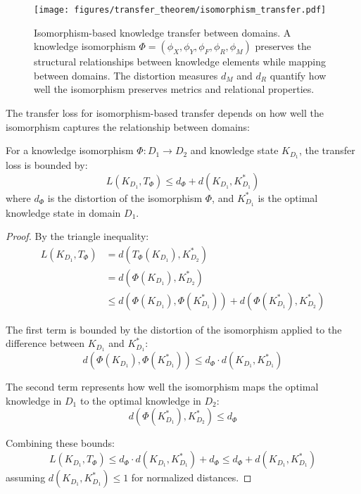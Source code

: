 \begin{figure}[ht]
    \centering
    \texttt{[image: figures/transfer\_theorem/isomorphism\_transfer.pdf]}
    \caption{Isomorphism-based knowledge transfer between domains. A knowledge isomorphism $\Phi = (\phi_X, \phi_Y, \phi_F, \phi_R, \phi_M)$ preserves the structural relationships between knowledge elements while mapping between domains. The distortion measures $d_M$ and $d_R$ quantify how well the isomorphism preserves metrics and relational properties.}
    \label{fig:isomorphism_transfer}
\end{figure}

The transfer loss for isomorphism-based transfer depends on how well the isomorphism captures the relationship between domains:

\begin{theorem}
For a knowledge isomorphism $\Phi: D_1 \to D_2$ and knowledge state $K_{D_1}$, the transfer loss is bounded by:
\begin{equation}
L(K_{D_1}, T_{\Phi}) \leq d_{\Phi} + d(K_{D_1}, K_{D_1}^*)
\end{equation}
where $d_{\Phi}$ is the distortion of the isomorphism $\Phi$, and $K_{D_1}^*$ is the optimal knowledge state in domain $D_1$.
\end{theorem}

\begin{proof}
By the triangle inequality:
\begin{align}
L(K_{D_1}, T_{\Phi}) &= d(T_{\Phi}(K_{D_1}), K_{D_2}^*) \\
&= d(\Phi(K_{D_1}), K_{D_2}^*) \\
&\leq d(\Phi(K_{D_1}), \Phi(K_{D_1}^*)) + d(\Phi(K_{D_1}^*), K_{D_2}^*)
\end{align}

The first term is bounded by the distortion of the isomorphism applied to the difference between $K_{D_1}$ and $K_{D_1}^*$:
\begin{equation}
d(\Phi(K_{D_1}), \Phi(K_{D_1}^*)) \leq d_{\Phi} \cdot d(K_{D_1}, K_{D_1}^*)
\end{equation}

The second term represents how well the isomorphism maps the optimal knowledge in $D_1$ to the optimal knowledge in $D_2$:
\begin{equation}
d(\Phi(K_{D_1}^*), K_{D_2}^*) \leq d_{\Phi}
\end{equation}

Combining these bounds:
\begin{equation}
L(K_{D_1}, T_{\Phi}) \leq d_{\Phi} \cdot d(K_{D_1}, K_{D_1}^*) + d_{\Phi} \leq d_{\Phi} + d(K_{D_1}, K_{D_1}^*)
\end{equation}
assuming $d(K_{D_1}, K_{D_1}^*) \leq 1$ for normalized distances.
\end{proof}

